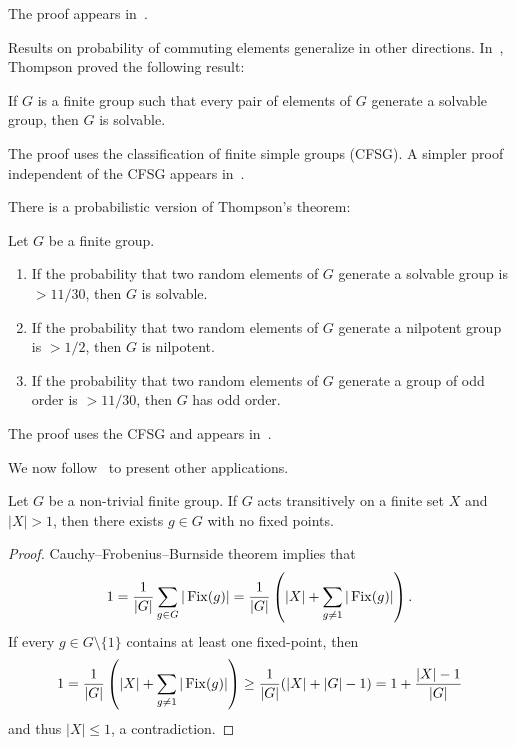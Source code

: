 The proof appears in~\cite{MR2228209}.

Results on probability of commuting elements generalize in other directions. 
In~\cite{MR230809,MR276325,MR313378,MR369512}, 
Thompson proved the following result:

\begin{theorem}[Thompson]
    If $G$ is a finite group such that 
    every pair of elements of $G$ generate
    a solvable group, then $G$ is solvable. 
\end{theorem}

The proof uses the classification of finite simple groups (CFSG). A simpler
proof independent of the CFSG appears in~\cite{MR1346207}.

There is a probabilistic version of Thompson's theorem:

\begin{theorem}
    Let $G$ be a finite group.
    \begin{enumerate}
        \item If the probability that two random elements of $G$ 
        generate a solvable group is $>11/30$, then $G$ is solvable. 
        \item If the probability that two random elements of $G$ 
        generate a nilpotent group is $>1/2$, then $G$ is nilpotent.
        \item If the probability that two random elements of $G$ 
        generate a group of odd order is $>11/30$, then $G$ has odd order.
    \end{enumerate}
\end{theorem}

The proof uses the CFSG and appears in~\cite{MR1770615}.


We now follow~\cite{MR1997347} to present other applications. 

\begin{theorem}[Jordan]
    Let $G$ be a non-trivial finite group. If $G$ acts transitively 
    on a finite set $X$ and $|X|>1$, then there exists 
    $g\in G$ with no fixed points.
\end{theorem}

\begin{proof}
    Cauchy--Frobenius--Burnside theorem implies that
    \[
    1=\frac{1}{|G|}\sum_{g\in G}|\operatorname{Fix}(g)|=\frac{1}{|G|}\left(|X|+\sum_{g\ne 1}|\operatorname{Fix}(g)|\right).
    \]
    If every $g\in G\setminus\{1\}$ contains at least one fixed-point, then
    \[
    1=\frac{1}{|G|}\left(|X|+\sum_{g\ne 1}|\operatorname{Fix}(g)|\right)\geq \frac{1}{|G|}(|X|+|G|-1)=1+\frac{|X|-1}{|G|}
    \]
    and thus $|X|\leq1$, a contradiction. 
\end{proof}

